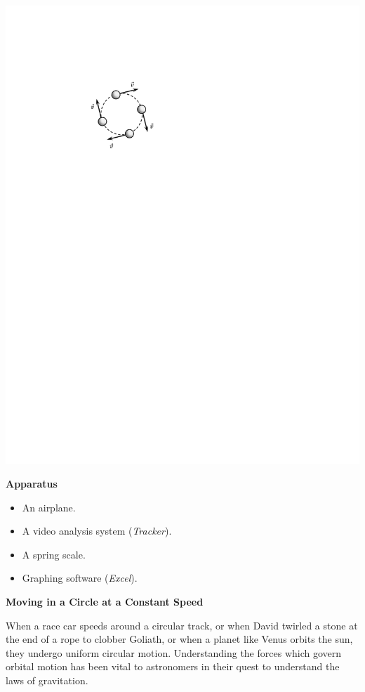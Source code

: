 \vspace{0.3cm}
{\par\centering \includegraphics{centripetal/centripetal_fig1_new.pdf} \par}
\vspace{0.3cm}

\textbf{Apparatus}

\begin{itemize}
\item An airplane. 
\item A video analysis system (\textit{Tracker}). 
\item A spring scale. 
\item Graphing software (\textit{Excel}). 
\end{itemize}
\textbf{Moving in a Circle at a Constant Speed }

When a race car speeds around a circular track, or when David twirled a stone
at the end of a rope to clobber Goliath, or when a planet like Venus orbits
the sun, they undergo uniform circular motion. Understanding the forces which
govern orbital motion has been vital to astronomers in their quest to understand
the laws of gravitation. 

